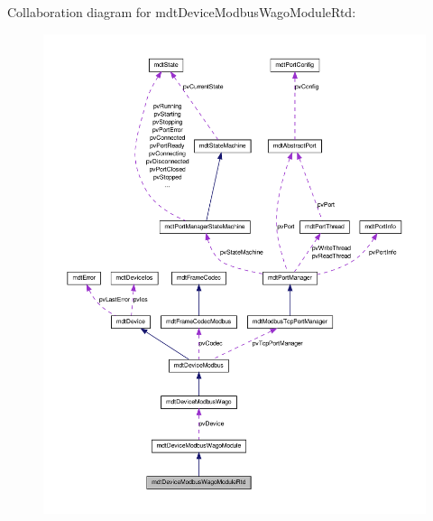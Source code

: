 Collaboration diagram for mdtDeviceModbusWagoModuleRtd:\nopagebreak
\begin{figure}[H]
\begin{center}
\leavevmode
\includegraphics[width=400pt]{classmdt_device_modbus_wago_module_rtd__coll__graph}
\end{center}
\end{figure}
